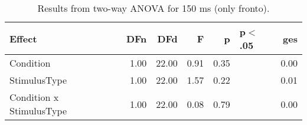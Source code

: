 \begin{table}[ht]
\centering
\begin{tabulary}{\textwidth}{lrrrrlr}
  \toprule
Effect & DFn & DFd & F & p & p$<$.05 & ges \\ 
  \midrule
Condition & 1.00 & 22.00 & 0.91 & 0.35 &  & 0.00 \\ 
  StimulusType & 1.00 & 22.00 & 1.57 & 0.22 &  & 0.01 \\ 
  Condition x StimulusType & 1.00 & 22.00 & 0.08 & 0.79 &  & 0.00 \\ 
   \bottomrule
\end{tabulary}
\caption{Results from two-way ANOVA for 150 ms (only fronto).} 
\end{table}

